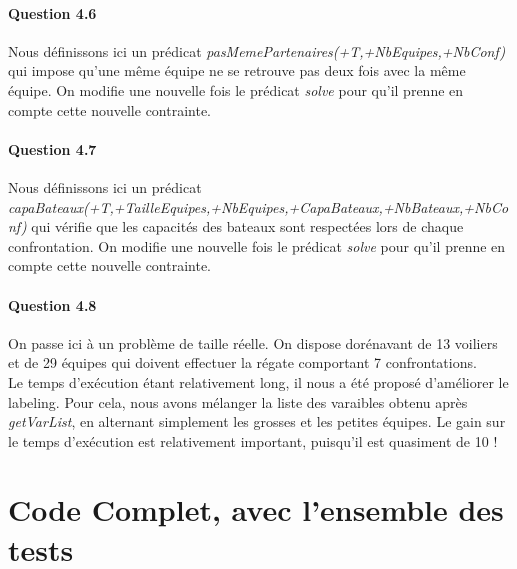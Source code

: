 \documentclass[11pt]{article} %
\begin{document}
\paragraph{Question 4.6}
Nous définissons ici un prédicat \textit{pasMemePartenaires(+T,+NbEquipes,+NbConf)} qui impose qu'une même équipe ne se retrouve pas deux fois avec la même équipe. On modifie une nouvelle fois le prédicat  \textit{solve} pour qu'il prenne en compte cette nouvelle contrainte.


\paragraph{Question 4.7}
Nous définissons ici un prédicat \textit{capaBateaux(+T,+TailleEquipes,+NbEquipes,+CapaBateaux,+NbBateaux,+NbConf)} qui vérifie que les capacités des bateaux sont respectées lors de chaque confrontation. On modifie une nouvelle fois le prédicat  \textit{solve} pour qu'il prenne en compte cette nouvelle contrainte.


\paragraph{Question 4.8}
On passe ici à un problème de taille réelle. On dispose dorénavant de 13 voiliers et de 29 équipes qui doivent effectuer la régate comportant 7 confrontations.\\
Le temps d'exécution étant relativement long, il nous a été proposé d'améliorer le labeling. Pour cela, nous avons mélanger la liste des varaibles obtenu après \textit{getVarList}, en alternant simplement les grosses et les petites équipes. Le gain sur le temps d'exécution est relativement important, puisqu'il est quasiment de 10 !


\newpage

\section{Code Complet, avec l'ensemble des tests}

\end{document}
